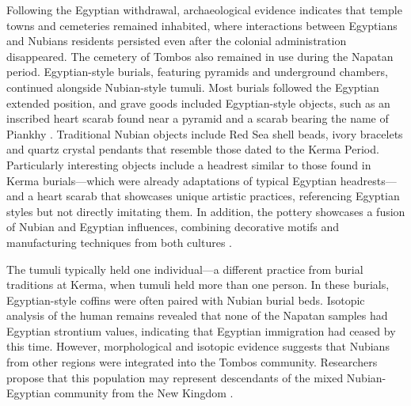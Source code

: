 Following the Egyptian withdrawal, archaeological evidence indicates that temple towns and cemeteries remained inhabited, where interactions between Egyptians and Nubians residents persisted even after the colonial administration disappeared. The cemetery of Tombos also remained in use during the Napatan period. Egyptian-style burials, featuring pyramids and underground chambers, continued alongside Nubian-style tumuli. Most burials followed the Egyptian extended position, and grave goods included Egyptian-style objects, such as an inscribed heart scarab found near a pyramid and a scarab bearing the name of Piankhy \parencite[p.~293-294]{buzonEntanglementFormationAncient2016}. Traditional Nubian objects include Red Sea shell beads, ivory bracelets and quartz crystal pendants that resemble those dated to the Kerma Period. Particularly interesting objects include a headrest similar to those found in Kerma burials---which were already adaptations of typical Egyptian headrests---and a heart scarab that showcases unique artistic practices, referencing Egyptian styles but not directly imitating them. In addition, the pottery showcases a fusion of Nubian and Egyptian influences, combining decorative motifs and manufacturing techniques from both cultures \parencites[p.~6-9]{smithColonialEntanglementsEgyptianization2014}[p.~637-642]{buzonTumuliTombosInnovation2023}.


The tumuli typically held one individual---a different practice from burial traditions at Kerma, when tumuli held more than one person. In these burials, Egyptian-style coffins were often paired with Nubian burial beds. Isotopic analysis of the human remains revealed that none of the Napatan samples had Egyptian strontium values, indicating that Egyptian immigration had ceased by this time. However, morphological and isotopic evidence suggests that Nubians from other regions were integrated into the Tombos community. Researchers propose that this population may represent descendants of the mixed Nubian-Egyptian community from the New Kingdom \parencites{schraderIlluminatingNubianDark2014}[p.~294-295]{buzonEntanglementFormationAncient2016}{buzonTumuliTombosInnovation2023}{buzonExploringIntersectionalIdentities2024}{smithCrossCulturalInteractionAncient2018}.


